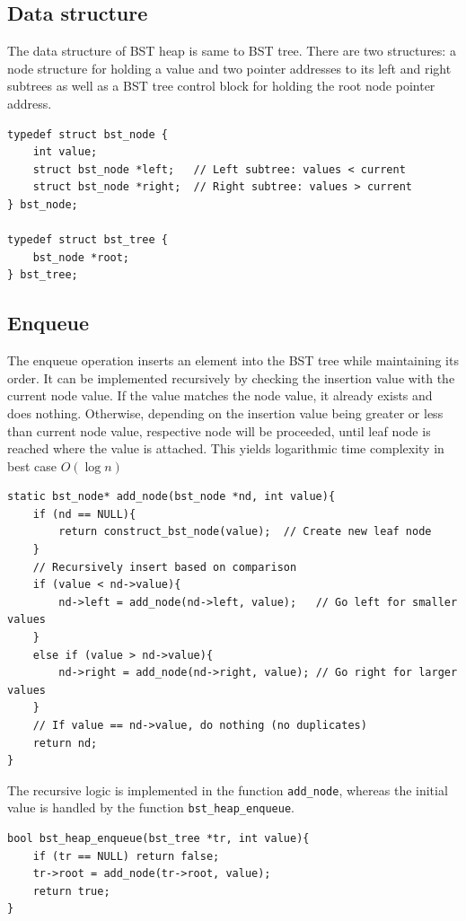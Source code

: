 \documentclass[a4paper,11pt]{article}
\begin{document}
\subsection*{Data structure}

The data structure of BST heap is same to BST tree. There are two structures: a node structure for holding a value and two pointer addresses to its left and right subtrees as well as a BST tree control block for holding the root node pointer address.

\begin{verbatim}
typedef struct bst_node {
    int value;
    struct bst_node *left;   // Left subtree: values < current
    struct bst_node *right;  // Right subtree: values > current
} bst_node;

typedef struct bst_tree {
    bst_node *root;
} bst_tree;
\end{verbatim}

\subsection*{Enqueue}
The enqueue operation inserts an element into the BST tree while maintaining its order. It can be implemented recursively by checking the insertion value with the current node value. If the value matches the node value, it already exists and does nothing. Otherwise, depending on the insertion value being greater or less than current node value, respective node will be proceeded, until leaf node is reached where the value is attached. This yields logarithmic time complexity in best case $O(\log n)$

\begin{verbatim}
static bst_node* add_node(bst_node *nd, int value){
    if (nd == NULL){
        return construct_bst_node(value);  // Create new leaf node
    }
    // Recursively insert based on comparison
    if (value < nd->value){
        nd->left = add_node(nd->left, value);   // Go left for smaller values
    }
    else if (value > nd->value){
        nd->right = add_node(nd->right, value); // Go right for larger values
    }
    // If value == nd->value, do nothing (no duplicates)
    return nd;
}
\end{verbatim}

The recursive logic is implemented in the function \texttt{add\_node}, whereas the initial value is handled by the function \texttt{bst\_heap\_enqueue}.

\begin{verbatim}
bool bst_heap_enqueue(bst_tree *tr, int value){
    if (tr == NULL) return false;
    tr->root = add_node(tr->root, value);
    return true;
}
\end{verbatim}
\end{document}
